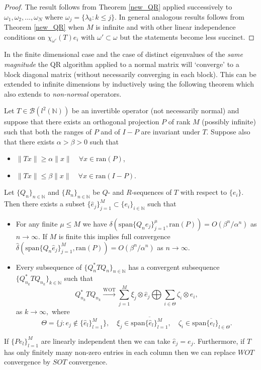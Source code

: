 \documentclass[a4paper,10pt]{article}
\begin{document}
\begin{proof}
The result follows from Theorem \ref{new_QR} applied successively to $\omega_1,\omega_2,...,\omega_N$ where $\omega_j=\{\lambda_k:k\leq j\}$. In general analogous results follows from Theorem \ref{new_QR} when $M$ is infinite and with other linear independence conditions on $\chi_{\omega'}(T)e_i$ with $\omega'\subset\omega$ but the statements become less succinct.
\end{proof}

In the finite dimensional case and the case of distinct eigenvalues of the \textit{same magnitude} the QR algorithm applied to a normal matrix will `converge' to a block diagonal matrix (without necessarily converging in each block). This can be extended to infinite dimensions by inductively using the following theorem which also extends to \textit{non-normal} operators.

\begin{theorem}
\label{non_normal_prop}
Let $T \in \mathcal{B}(l^2(\mathbb{N}))$ be an invertible operator (not necessarily normal) and suppose that there exists an orthogonal projection $P$ of rank $M$ (possibly infinite) such that both the ranges of $P$ and of $I-P$ are invariant under $T$. Suppose also that there exists $\alpha>\beta>0$ such that
\begin{itemize}
	\item $\|Tx\|\geq \alpha \|x\|\quad \forall x\in \mathrm{ran}(P)$,
	\item $\|Tx\|\leq \beta \|x\| \quad \forall x\in \mathrm{ran}(I-P)$.
\end{itemize}
Let $\{Q_n\}_{n\in\mathbb{N}}$ and $\{R_n\}_{n\in\mathbb{N}}$ be $Q$- and $R$-sequences of $T$ with respect to $\{e_i\}.$ Then there exists a subset $\{\hat e_j\}_{j=1}^M\subset \{e_i\}_{i\in\mathbb{N}}$ such that
\begin{itemize}
	\item[(i)] For any finite $\mu\leq M$ we have $\delta (\mathrm{span}\{Q_n\hat e_j\}_{j=1}^\mu,\mathrm{ran}(P))= O(\beta^n/\alpha^n)$ as $n\rightarrow\infty$. If $M$ is finite this implies full convergence $\hat\delta (\mathrm{span}\{Q_n\hat e_j\}_{j=1}^M,\mathrm{ran}(P))= O(\beta^n/\alpha^n)$ as $n\rightarrow\infty$.
	\item[(ii)] Every subsequence of $\{Q_n^*TQ_n\}_{n\in\mathbb{N}}$ has a convergent subsequence 
$\{Q_{n_k}^*TQ_{n_k}\}_{k\in\mathbb{N}}$ such that 
\begin{equation*}
Q_{n_k}^*TQ_{n_k} \stackrel{\text{WOT}}{\longrightarrow} \sum_{j=1}^M \xi_j \otimes \hat e_j \bigoplus \sum_{i \in \Theta} \zeta_i \otimes e_i, 
\end{equation*}
as $k \rightarrow \infty,$ where
$$
\Theta = \{j: e_j \notin \{\hat e_l\}_{l=1}^M\}, \quad \xi_j \in \overline{\mathrm{span}\{\hat e_l\}_{l=1}^M}, \quad \zeta_i \in \overline{\mathrm{span}\{e_l\}_{l\in\Theta}}.$$
\end{itemize}
If $\{Pe_l\}_{l=1}^M$ are linearly independent then we can take $\hat e_j=e_j$. Furthermore, if $T$ has only finitely many non-zero entries in each column then we can replace $WOT$ convergence by $SOT$ convergence.
\end{theorem}
\end{document}
